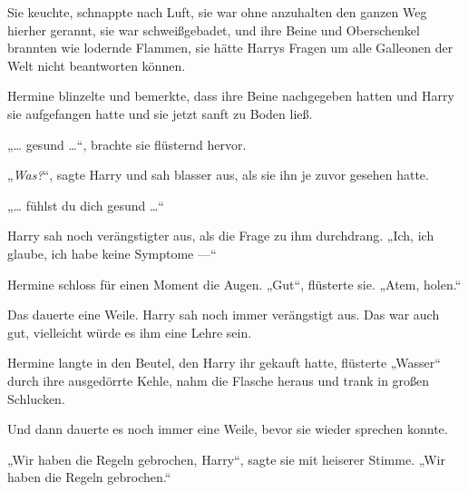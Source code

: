 Sie keuchte, schnappte nach Luft, sie war ohne anzuhalten den ganzen Weg hierher gerannt, sie war schweißgebadet, und ihre Beine und Oberschenkel brannten wie lodernde Flammen, sie hätte Harrys Fragen um alle Galleonen der Welt nicht beantworten können.

Hermine blinzelte und bemerkte, dass ihre Beine nachgegeben hatten und Harry sie aufgefangen hatte und sie jetzt sanft zu Boden ließ.

„… gesund …“, brachte sie flüsternd hervor.

„\emph{Was?}“, sagte Harry und sah blasser aus, als sie ihn je zuvor gesehen hatte.

„… fühlst du dich gesund …“

Harry sah noch verängstigter aus, als die Frage zu ihm durchdrang.
„Ich, ich glaube, ich habe keine Symptome —“

Hermine schloss für einen Moment die Augen.
„Gut“, flüsterte sie.
„Atem, holen.“

Das dauerte eine Weile. Harry sah noch immer verängstigt aus. Das war auch gut, vielleicht würde es ihm eine Lehre sein.

Hermine langte in den Beutel, den Harry ihr gekauft hatte, flüsterte
„Wasser“ durch ihre ausgedörrte Kehle, nahm die Flasche heraus und trank in großen Schlucken.

Und dann dauerte es noch immer eine Weile, bevor sie wieder sprechen konnte.

„Wir haben die Regeln gebrochen, Harry“, sagte sie mit heiserer Stimme.
„Wir haben die Regeln gebrochen.“

